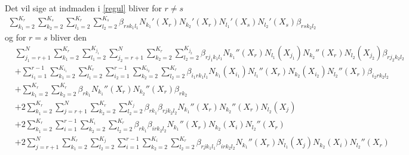 \documentclass[a4paper, 12pt]{memoir}
\begin{document}
Det vil sige at indmaden i \eqref{regul} bliver for $r\neq s$
\begin{align}
\sum_{k_1=2}^{K_r}\sum_{k_2=2}^{K_s}\sum_{l_1=2}^{K_r}\sum_{l_2=2}^{K_s} \beta_{rsk_1l_1}N_{k_1}'(X_r)N_{k_2}'(X_r)N_{l_1}'(X_s)N_{l_2}'(X_s)\beta_{rsk_2l_2} \label{regul_rneqs}
\end{align}
og for $r=s$ bliver den
\begin{align}
&\sum_{j_1=r+1}^N \sum_{k_1=2}^{K_r}\sum_{l_1=2}^{K_{j_1}} \sum_{j_2=r+1}^N \sum_{k_2=2}^{K_r}\sum_{l_2=2}^{K_{j_2}}
 \beta_{rj_1k_1l_1} N_{k_1}''(X_r)N_{l_1}(X_{j_1})  N_{k_2}''(X_r)N_{l_2}(X_{j_2})\beta_{rj_2k_2l_2} \label{regul_reqs_j1j2}\\
 &+\sum_{i_1=1}^{r-1} \sum_{k_1=2}^{K_{i_1}}\sum_{l_1=2}^{K_{r}} \sum_{i_2=1}^{r-1} \sum_{k_2=2}^{K_{i_2}}\sum_{l_2=2}^{K_{r}}
 \beta_{i_1rk_1l_1} N_{k_1}(X_{i_1})N_{l_1}''(X_{r})  N_{k_2}(X_{i_2})N_{l_2}''(X_{r})\beta_{i_2rk_2l_2} \label{regul_reqs_i1i2}\\
   &+ \sum_{k_1=2}^{K_r}\sum_{k_2=2}^{K_r}  \beta_{rk_1} N_{k_1}''(X_r)N_{k_2}''(X_r) \beta_{rk_2} \label{regul_reqs_k1k2}\\
   &+2 \sum_{k_1=2}^{K_r}\sum_{j=r+1}^N\sum_{k_2=2}^{K_r}\sum_{l_2=2}^{K_{j}} \beta_{rk_1} \beta_{rjk_2l_2} N_{k_1}''(X_r)N_{k_2}''(X_r)N_{l_2}(X_j)\label{regul_reqs_k1j}\\
   &+2 \sum_{k_1=2}^{K_r}\sum_{i=1}^{r-1}\sum_{k_2=2}^{K_{i}}\sum_{l_2=2}^{K_{r}} \beta_{rk_1} \beta_{irk_2l_2} N_{k_1}''(X_r)N_{k_2}(X_i)N_{l_2}''(X_r)\label{regul_reqs_k1i}\\
      &+2 \sum_{j=r+1}^N \sum_{k_1=2}^{K_r} \sum_{l_2=2}^{K_{j}} \sum_{i=1}^{r-1}\sum_{k_2=2}^{K_{i}}\sum_{l_2=2}^{K_{r}} \beta_{rjk_1l_1} \beta_{irk_2l_2} N_{k_1}''(X_r)N_{l_1}(X_j)N_{k_2}(X_i)N_{l_2}''(X_r)\label{regul_reqs_k1i}
\end{align}
\end{document}
